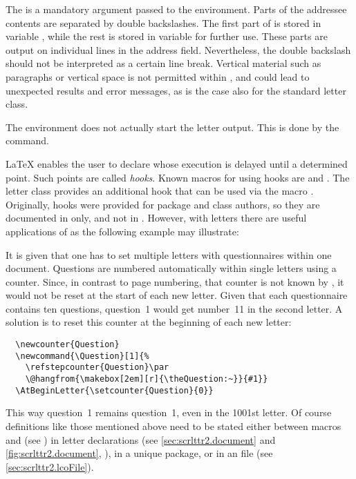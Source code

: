 The  is a mandatory argument passed to the
 environment. Parts of the addressee contents are
separated by double backslashes. The first part of 
is stored in variable , while the rest is stored in
variable  for further use. These parts are output
on individual lines in the address field. Nevertheless, the double
backslash should not be interpreted as a certain line break. Vertical
material such as paragraphs or vertical space is not permitted within
, and could lead to unexpected results and error
messages, as is the case also for the standard letter class. 

The  environment does not actually start the
letter output. This is done by the  command.
%
%


\begin{Declaration}
\end{Declaration}
%
{\LaTeX} enables the user to declare  whose execution
is delayed until a determined point. Such points are called
\emph{hooks}. Known macros for using hooks are 
and . The letter class  provides
an additional hook that can be used via the macro
.  Originally, hooks were provided for package
and class authors, so they are documented in \cite{latex:clsguide}
only, and not in \cite{latex:usrguide}. However, with letters there
are useful applications of  as the following
example may illustrate:
%
\begin{Example}
  It is given that one has to set multiple letters with questionnaires
  within one document. Questions are numbered automatically within
  single letters using a counter. Since, in contrast to page
  numbering, that counter is not known by , it would
  not be reset at the start of each new letter. Given that each
  questionnaire contains ten questions, question~1 would get number~11
  in the second letter. A solution is to reset this counter at the
  beginning of each new letter:
\begin{lstlisting}
  \newcounter{Question}
  \newcommand{\Question}[1]{%
    \refstepcounter{Question}\par
    \@hangfrom{\makebox[2em][r]{\theQuestion:~}}{#1}}
  \AtBeginLetter{\setcounter{Question}{0}}
\end{lstlisting}
This way question~1 remains question~1, even in the 1001st letter. Of
course definitions like those mentioned above need to be stated either
between macros  and  (see
\cite{DANTE:FAQ}) in letter declarations (see
\autoref{sec:scrlttr2.document} and \autoref{fig:scrlttr2.document},
), in a unique package, or in an
 file (see \autoref{sec:scrlttr2.lcoFile}).
\end{Example}
%
%
%
%

